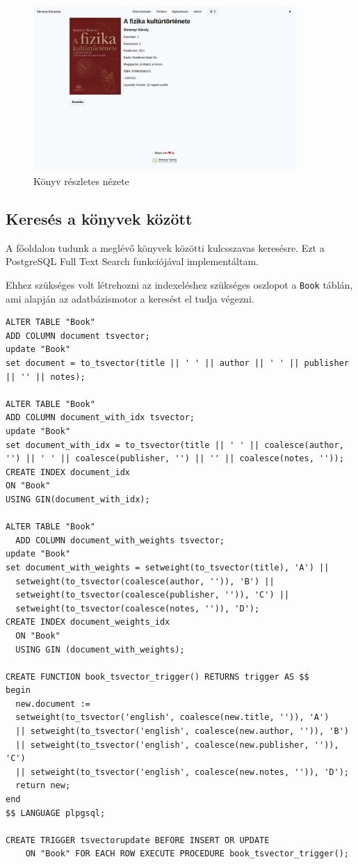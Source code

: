 \begin{figure}[!ht]
  \centering
  \includegraphics[width=100mm, keepaspectratio]{figures/book-detail-view.png}
  \caption{Könyv részletes nézete}
  \label{fig:BookDetailView}
\end{figure}

\subsection{Keresés a könyvek között}

A főoldalon tudunk a meglévő könyvek közötti kulcsszavas keresésre. Ezt a PostgreSQL Full Text Search funkciójával implementáltam.

Ehhez szükséges volt létrehozni az indexeléshez szükséges oszlopot a \lstinline|Book| táblán, ami alapján az adatbázismotor a keresést
el tudja végezni.

\begin{lstlisting}[caption=A kereséshez szükséges SQL utasítások]
ALTER TABLE "Book"
ADD COLUMN document tsvector;
update "Book"
set document = to_tsvector(title || ' ' || author || ' ' || publisher || '' || notes);

ALTER TABLE "Book"
ADD COLUMN document_with_idx tsvector;
update "Book"
set document_with_idx = to_tsvector(title || ' ' || coalesce(author, '') || ' ' || coalesce(publisher, '') || '' || coalesce(notes, ''));
CREATE INDEX document_idx
ON "Book"
USING GIN(document_with_idx);

ALTER TABLE "Book"
  ADD COLUMN document_with_weights tsvector;
update "Book"
set document_with_weights = setweight(to_tsvector(title), 'A') ||
  setweight(to_tsvector(coalesce(author, '')), 'B') ||
  setweight(to_tsvector(coalesce(publisher, '')), 'C') ||
  setweight(to_tsvector(coalesce(notes, '')), 'D');
CREATE INDEX document_weights_idx
  ON "Book"
  USING GIN (document_with_weights);

CREATE FUNCTION book_tsvector_trigger() RETURNS trigger AS $$
begin
  new.document :=
  setweight(to_tsvector('english', coalesce(new.title, '')), 'A')
  || setweight(to_tsvector('english', coalesce(new.author, '')), 'B')
  || setweight(to_tsvector('english', coalesce(new.publisher, '')), 'C')
  || setweight(to_tsvector('english', coalesce(new.notes, '')), 'D');
  return new;
end
$$ LANGUAGE plpgsql;

CREATE TRIGGER tsvectorupdate BEFORE INSERT OR UPDATE
    ON "Book" FOR EACH ROW EXECUTE PROCEDURE book_tsvector_trigger();

\end{lstlisting}

